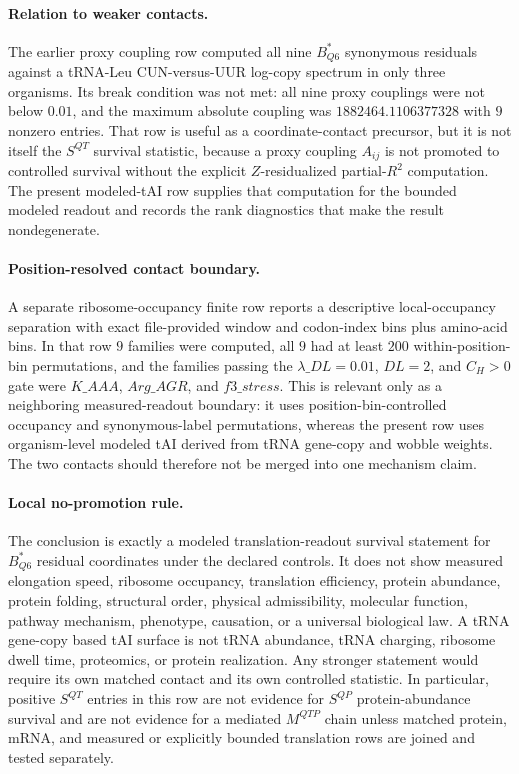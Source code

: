 \paragraph{Relation to weaker contacts.}
The earlier proxy coupling row computed all nine $B^{*}_{Q6}$ synonymous residuals against a tRNA-Leu CUN-versus-UUR log-copy spectrum in only three organisms.  Its break condition was not met: all nine proxy couplings were not below $0.01$, and the maximum absolute coupling was $1882464.1106377328$ with $9$ nonzero entries.  That row is useful as a coordinate-contact precursor, but it is not itself the $S^{QT}$ survival statistic, because a proxy coupling $A_{ij}$ is not promoted to controlled survival without the explicit $Z$-residualized partial-$R^{2}$ computation.  The present modeled-tAI row supplies that computation for the bounded modeled readout and records the rank diagnostics that make the result nondegenerate.

\paragraph{Position-resolved contact boundary.}
A separate ribosome-occupancy finite row reports a descriptive local-occupancy separation with exact file-provided window and codon-index bins plus amino-acid bins.  In that row $9$ families were computed, all $9$ had at least $200$ within-position-bin permutations, and the families passing the $\lambda\_{DL}=0.01$, $DL=2$, and $C_H>0$ gate were $K\_AAA$, $Arg\_AGR$, and $f3\_stress$.  This is relevant only as a neighboring measured-readout boundary: it uses position-bin-controlled occupancy and synonymous-label permutations, whereas the present row uses organism-level modeled tAI derived from tRNA gene-copy and wobble weights.  The two contacts should therefore not be merged into one mechanism claim.

\paragraph{Local no-promotion rule.}
The conclusion is exactly a modeled translation-readout survival statement for $B^{*}_{Q6}$ residual coordinates under the declared controls.  It does not show measured elongation speed, ribosome occupancy, translation efficiency, protein abundance, protein folding, structural order, physical admissibility, molecular function, pathway mechanism, phenotype, causation, or a universal biological law.  A tRNA gene-copy based tAI surface is not tRNA abundance, tRNA charging, ribosome dwell time, proteomics, or protein realization.  Any stronger statement would require its own matched contact and its own controlled statistic.  In particular, positive $S^{QT}$ entries in this row are not evidence for $S^{QP}$ protein-abundance survival and are not evidence for a mediated $M^{QTP}$ chain unless matched protein, mRNA, and measured or explicitly bounded translation rows are joined and tested separately.